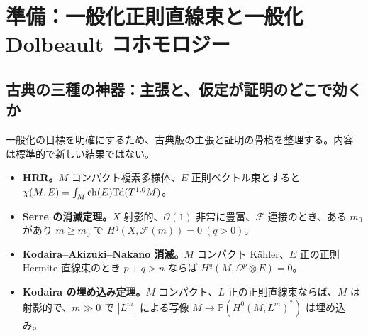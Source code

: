 \section{準備：一般化正則直線束と一般化 Dolbeault コホモロジー}\label{sec:prelim}
\subsection{古典の三種の神器：主張と、仮定が証明のどこで効くか}\label{subsec:classical}
一般化の目標を明確にするため、古典版の主張と証明の骨格を整理する。内容は標準的で新しい結果ではない\tC。

\begin{itemize}
\item \textbf{HRR。}$M$ コンパクト複素多様体、$E$ 正則ベクトル束とすると $\chi(M,E)=\int_M\mathrm{ch}(E)\mathrm{Td}(T^{1,0}M)$。
\item \textbf{Serre の消滅定理。}$X$ 射影的、$\mathcal O(1)$ 非常に豊富、$\mathcal F$ 連接のとき、ある $m_0$ があり $m\ge m_0$ で $H^q(X,\mathcal F(m))=0\ (q>0)$。
\item \textbf{Kodaira--Akizuki--Nakano 消滅。}$M$ コンパクト Kähler、$E$ 正の正則 Hermite 直線束のとき $p+q>n$ ならば $H^q(M,\Omega^p\otimes E)=0$。
\item \textbf{Kodaira の埋め込み定理。}$M$ コンパクト、$L$ 正の正則直線束ならば、$M$ は射影的で、$m\gg0$ で $|L^m|$ による写像 $M\to\mathbb P(H^0(M,L^m)^*)$ は埋め込み。
\end{itemize}


